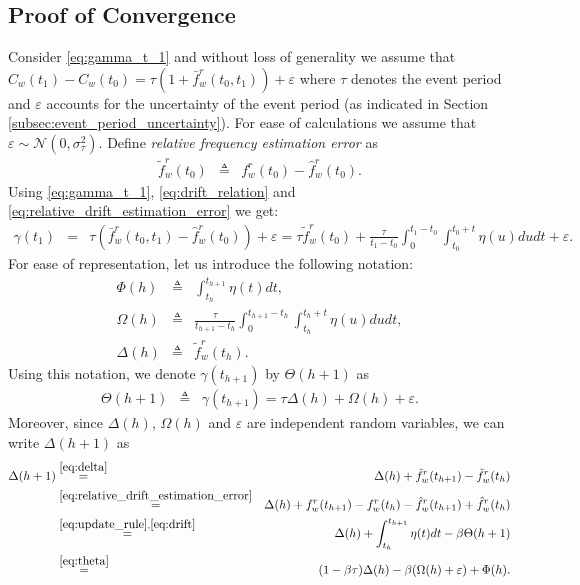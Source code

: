 \documentclass[journal,draftcls,onecolumn,12pt,twoside]{IEEEtranTCOM}
\begin{document}
\subsection{Proof of Convergence}
Consider \eqref{eq:gamma_t_1} and without loss of 
generality we assume that 
$C_{w}(t_{1})-C_{w}(t_{0})=\tau(1+\bar{f}_{w}^{r}(t_0,t_1))+\varepsilon$
where $\tau$ denotes the event period and $\varepsilon$ accounts for the 
uncertainty of the event period (as 
indicated in Section \ref{subsec:event_period_uncertainty}). For ease of 
calculations we assume that $\varepsilon\sim\mathcal{N}(0,\sigma^2_{\tau})$. 
Define \emph{relative frequency estimation error} as
\begin{eqnarray}
\tilde{f}_{w}^{r}(t_0) & \triangleq & 
f_{w}^{r}(t_0)-\hat{f}_{w}^{r}(t_0).\label{eq:relative_drift_estimation_error}
\end{eqnarray}
Using \eqref{eq:gamma_t_1}, \eqref{eq:drift_relation} and 
\eqref{eq:relative_drift_estimation_error} we get:
\begin{eqnarray}
\gamma(t_1) & = & 
\tau(\bar{f}_{w}^{r}(t_0,t_1)-\hat{f}_{w}^{r}(t_0))+ \varepsilon = 
\tau\tilde{f}_{w}^{r}(t_0)+\frac{\tau}{t_1-t_0}\int_{0}^{t_1-t_0}\int_{t_{0}}^{t_0+t}\eta(u)dudt
+ \varepsilon.
\end{eqnarray}
For ease of representation, let us introduce the following 
notation:
\begin{eqnarray}
\Phi(h) &\triangleq& \int_{t_h}^{t_{h+1}}\eta(t)dt, \\
\Omega(h) &\triangleq& 
\frac{\tau}{t_{h+1}-t_h}\int_{0}^{t_{h+1}-t_h}\int_{t_{h}}^{t_h+t}\eta(u)dudt,
\\
\Delta(h) &\triangleq& \tilde{f}_{w}^{r}(t_{h}). \label{eq:delta}
\end{eqnarray}
Using this notation, we denote $\gamma(t_{h+1})$ by $\Theta(h+1)$ as
\begin{eqnarray}
\Theta(h+1) &\triangleq& \gamma(t_{h+1})=\tau\Delta(h) + \Omega(h)+\varepsilon. 
\label{eq:theta}
\end{eqnarray}
Moreover, since $\Delta(h)$, $\Omega(h)$ and $\varepsilon$ are 
independent random variables, we can write $\Delta(h+1)$ as
\begin{eqnarray}
\Delta(h+1) &\overset{\eqref{eq:delta}}{=}& 
\Delta(h)+\tilde{f}_{w}^{r}(t_{h+1})-\tilde{f}_{w}^{r}(t_{h}) \nonumber \\
&\overset{\eqref{eq:relative_drift_estimation_error}}{=}& \Delta(h)
+f_w^r(t_{h+1})-f_w^r(t_{h}) -\hat{f}_w^r(t_{h+1})+\hat{f}_w^r(t_{h})
\nonumber\\
&\overset{\eqref{eq:update_rule},\eqref{eq:drift}}{=}& 
\Delta(h)+\int_{t_h}^{t_{h+1}}\eta(t)dt-\beta\Theta(h+1) \nonumber \\
&\overset{\eqref{eq:theta}}{=}& 
(1-\beta\tau)\Delta(h)-\beta(\Omega(h)+\varepsilon) +\Phi(h). 
\label{eq:delta_recursive}
\end{eqnarray} 
\end{document}
